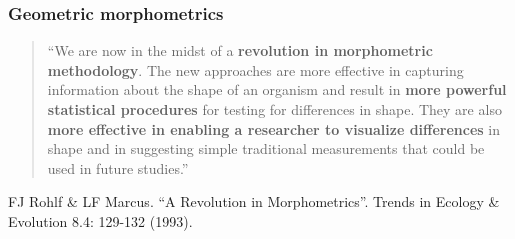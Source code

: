 \begin{frame}
\frametitle{Geometric morphometrics}
\begin{quote}
``We are now in the midst of a {\bf revolution in morphometric methodology}. The new approaches are more effective in capturing information about the shape of an organism and result in {\bf more powerful statistical procedures} for testing for differences in shape. They are also {\bf more effective in enabling a researcher to visualize differences} in shape and in suggesting simple traditional measurements that could be used in future studies.''
\end{quote}

\vspace{0.25cm}

\begin{tiny}
FJ Rohlf \& LF Marcus. ``A Revolution in Morphometrics''. Trends in Ecology \& Evolution 8.4: 129-132 (1993).\par
\end{tiny}
\end{frame}

